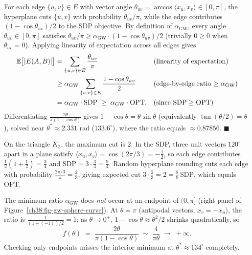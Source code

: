 \begin{whybox}
For each edge $\{u,v\}\in E$ with vector angle $\theta_{uv}=\arccos\langle x_u,x_v\rangle\in[0,\pi]$,
the hyperplane cuts $\{u,v\}$ with probability $\theta_{uv}/\pi$, while the edge contributes
$(1-\cos\theta_{uv})/2$ to the SDP objective. By definition of $\alpha_{\mathrm{GW}}$, every angle
$\theta_{uv}\in[0,\pi]$ satisfies $\theta_{uv}/\pi \ge \alpha_{\mathrm{GW}}\cdot(1-\cos\theta_{uv})/2$
(trivially $0 \ge 0$ when $\theta_{uv}=0$). Applying linearity of expectation across all edges gives
\begin{align*}
  \mathbb{E}\bigl[\lvert E(A,B)\rvert\bigr] &= \sum_{\{u,v\}\in E}\frac{\theta_{uv}}{\pi} && \text{(linearity of expectation)} \\
  &\ge \alpha_{\mathrm{GW}}\sum_{\{u,v\}\in E}\frac{1-\cos\theta_{uv}}{2} && \text{(edge-by-edge ratio $\ge \alpha_{\mathrm{GW}}$)} \\
  &= \alpha_{\mathrm{GW}}\cdot\mathrm{SDP} \;\ge\; \alpha_{\mathrm{GW}}\cdot\mathrm{OPT}. && \text{(since $\mathrm{SDP}\ge\mathrm{OPT}$)}
\end{align*}
Differentiating $\frac{2\theta}{\pi(1-\cos\theta)}$ gives $1 - \cos\theta = \theta\sin\theta$ (equivalently $\tan(\theta/2)=\theta$), solved
near $\theta^\ast\approx 2.331\text{ rad}$ ($133.6^\circ$), where the ratio equals $\approx 0.87856$. $\blacksquare$
\end{whybox}

On the triangle $K_3$, the maximum cut is $2$. In the SDP, three unit vectors $120^\circ$ apart in a plane
satisfy $\langle x_u,x_v\rangle = \cos(2\pi/3) = -\tfrac12$, so each edge contributes
$\tfrac12(1+\tfrac12)=\tfrac34$ and $\mathrm{SDP} = 3\cdot\tfrac34 = \tfrac94$. Random hyperplane rounding
cuts each edge with probability $\tfrac{2\pi/3}{\pi}=\tfrac23$, giving expected cut
$3\cdot\tfrac23 = 2 = \tfrac89\,\mathrm{SDP}$, which equals $\mathrm{OPT}$.

\begin{trapbox}
The minimum ratio $\alpha_{\mathrm{GW}}$ does \emph{not} occur at an endpoint of $(0,\pi]$ (right panel of
Figure~\ref{ch38:fig-gw-sphere-curve}). At $\theta=\pi$ (antipodal vectors, $x_v=-x_u$), the ratio is
$\frac{1}{(1-(-1))/2}=1$; as $\theta\to 0^+$, $1-\cos\theta \approx \theta^2/2$ shrinks quadratically, so
\[
  f(\theta) \;=\; \frac{2\theta}{\pi(1-\cos\theta)} \;\sim\; \frac{4}{\pi\theta} \;\longrightarrow\; +\infty.
\]
Checking only endpoints misses the interior minimum at $\theta^\ast\approx 134^\circ$ completely.
\end{trapbox}

